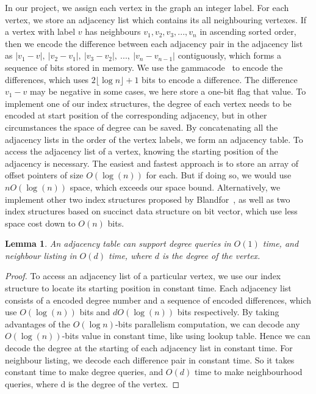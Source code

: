 \documentclass[12pt,glossary]{dalthesis}
\newtheorem{lemma}[theorem]{Lemma}
\begin{document}
In our project, we assign each vertex in the graph an integer label. For each vertex, we store an adjacency list which contains its all neighbouring vertexes. If a vertex with label $v$ has neighbours $v_{1}, v_{2}, v_{3}, ...,v_{n}$ in ascending sorted order, then we encode the difference between each adjacency pair in the adjacency list as $|v_{1}-v|, \ |v_{2}-v_{1}|,\  |v_{3}-v_{2}|,\ ...,\ |v_{n}-v_{n-1}|$ contiguously, which forms a sequence of bits stored in memory. We use the gammacode~\cite{Gamma} to encode the differences, which uses $2\lfloor \log n \rfloor + 1$ bits to encode a difference. The difference $v_{1} - v$ may be negative in some cases, we here store a one-bit flag that value. To implement one of our index structures, the degree of each vertex needs to be encoded at start position of the corresponding adjacency, but in other circumstances the space of degree can be saved. By concatenating all the adjacency lists in the order of the vertex labels, we form an adjacency table. To access the adjacency list of a vertex, knowing the starting position of the adjacency
is necessary. The easiest and fastest approach is to store an array of offset pointers of size $O(\log (n))$ for each. But if doing so, we would use $nO(\log (n))$ space, which exceeds our space bound. Alternatively, we implement other two index structures proposed by Blandfor~\cite{compact-representation}, as well as two index structures based on succinct data structure on bit vector, which use less space cost down to $O(n)$ bits.
\bigskip
\begin{lemma}
An adjacency table can support degree queries in $O(1)$ time, and neighbour
listing in $O(d)$ time, where $d$ is the degree of the vertex.
\end{lemma}
\bigskip 
\begin{proof}
To access an adjacency list of a particular vertex, we use our index structure to locate its starting position in constant time. Each adjacency list consists of a encoded degree number and a sequence of encoded differences, which use $O(\log (n))$ bits and $dO(\log (n))$ bits respectively. By taking advantages of the $O(\log n)$-bits parallelism computation, we can decode any $O(\log (n))$-bits value in constant time, like using lookup table. Hence we can decode the degree at the starting of each adjacency list in constant time. For neighbour listing, we decode each difference pair in constant time. So it takes constant time to make degree queries, and $O(d)$ time to make neighbourhood queries, where d is the degree of the vertex.
\end{proof}
\end{document}
